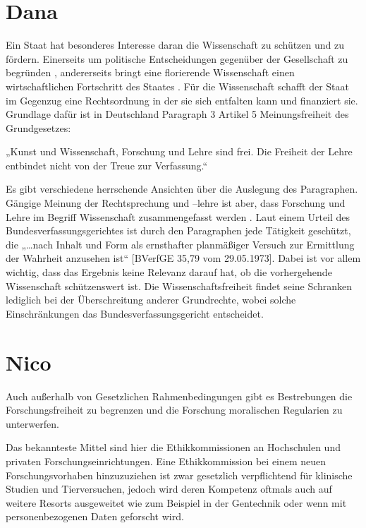 \documentclass{pmwk}
\begin{document}
\section*{Dana}
Ein Staat hat besonderes Interesse daran die Wissenschaft zu schützen und zu fördern. Einerseits um politische Entscheidungen gegenüber der Gesellschaft zu begründen \cite[S. 11]{Huber}, andererseits bringt eine florierende Wissenschaft einen wirtschaftlichen Fortschritt des Staates \cite[S. 35]{Huber}. Für die Wissenschaft schafft der Staat im Gegenzug eine Rechtsordnung in der sie sich entfalten kann und finanziert sie. Grundlage dafür ist in Deutschland Paragraph 3 Artikel 5 Meinungsfreiheit des Grundgesetzes:\par
„Kunst und Wissenschaft, Forschung und Lehre sind frei. Die Freiheit der Lehre entbindet nicht von der Treue zur Verfassung.“ \cite[GG Art 5 § 3]{gg}\par
Es gibt verschiedene herrschende Ansichten über die Auslegung des Paragraphen. Gängige Meinung der Rechtsprechung und –lehre ist aber, dass Forschung und Lehre im Begriff Wissenschaft zusammengefasst werden \cite[S. 27]{RechFrei}. Laut einem Urteil des Bundesverfassungsgerichtes ist durch den Paragraphen jede Tätigkeit geschützt, die „…nach Inhalt und Form als ernsthafter planmäßiger Versuch zur Ermittlung der Wahrheit anzusehen ist“ [BVerfGE 35,79 vom 29.05.1973]. Dabei ist vor allem wichtig, dass das Ergebnis keine Relevanz darauf hat, ob die vorhergehende Wissenschaft schützenswert ist. Die Wissenschaftsfreiheit findet seine Schranken lediglich bei der Überschreitung anderer Grundrechte, wobei solche Einschränkungen das Bundesverfassungsgericht entscheidet.

\section*{Nico}
Auch außerhalb von Gesetzlichen Rahmenbedingungen gibt es Bestrebungen die Forschungsfreiheit zu begrenzen und die Forschung moralischen Regularien zu unterwerfen.\par

Das bekannteste Mittel sind hier die Ethikkommissionen an Hochschulen und privaten Forschungseinrichtungen. Eine Ethikkommission bei einem neuen Forschungsvorhaben hinzuzuziehen ist zwar gesetzlich verpflichtend für klinische Studien und Tierversuchen, jedoch wird deren Kompetenz oftmals auch auf weitere Resorts ausgeweitet wie zum Beispiel in der Gentechnik oder wenn mit personenbezogenen Daten geforscht wird.\par
\end{document}

